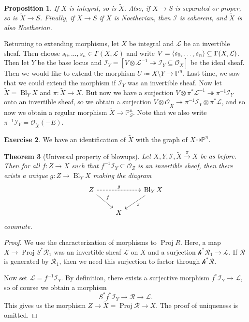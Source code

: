 \documentclass[leqno, openany]{memoir}
\newtheorem{thm}{Theorem}[section]
\newtheorem{prop}[thm]{Proposition}
\theoremstyle{definition}
\newtheorem{exer}[thm]{Exercise}
\theoremstyle{remark}
\theoremstyle{plain}
\theoremstyle{definition}
\theoremstyle{remark}
\renewcommand{\P}{\mathbb{P}}
\newcommand{\mc}[1]{\mathcal{#1}}
\newcommand{\wt}[1]{\widetilde{#1}}
\DeclareMathOperator{\Proj}{Proj}
\DeclareMathOperator{\Bl}{Bl}
\begin{document}
\begin{prop} If $X$ is integral, so is $\wt{X}$. Also, if $X \to S$ is
separated or proper, so is $\wt{X} \to S$. Finally, if $X \to S$ if $X$ is
Noetherian, then $\mc{I}$ is coherent, and $\wt{X}$ is also Noetherian.
\end{prop}

Returning to extending morphisms, let $X$ be integral and $\mc{L}$ be an
invertible sheaf. Then choose $s_0, \ldots, s_n \in \Gamma(X, \mc{L})$ and
write $V = \ev{s_0, \ldots, s_n} \subseteq \Gamma(X, \mc{L})$. Then let $Y$ be
the base locus and $\mc{I}_Y = [V \otimes \mc{L}^{-1} \twoheadrightarrow
\mc{I}_Y \subseteq \mc{O}_X]$ be the ideal sheaf. Then we would like to extend
the morphism $U \coloneqq X \setminus Y \to \P^n$. Last time, we saw that we
could extend the morphism if $\mc{I}_Y$ was an invertible sheaf. Now let
$\wt{X} = \Bl_Y X$ and $\pi \colon \wt{X} \to X$. But now we have a surjection
$V \otimes \pi^* \mc{L}^{-1} \twoheadrightarrow \pi^{-1} \mc{I}_Y$ onto an
invertible sheaf, so we obtain a surjection $V \otimes \mc{O}_{\wt{X}}
\twoheadrightarrow \pi^{-1} \mc{I}_Y \otimes \pi^* \mc{L}$, and so now we
obtain a regular morphism $\wt{X} \to \P^n_S$. Note that we also write
$\pi^{-1} \mc{I}_Y = \mc{O}_{\wt{X}}(-E)$.

\begin{exer} We have an identification of $\wt{X}$ with the graph of $X
\dashrightarrow \P^n$.  \end{exer}

\begin{thm}[Universal property of blowups] Let $X, Y, \mc{I}, \wt{X}
    \xrightarrow{\pi} X$ be as before. Then for all $f \colon Z \to X$ such
    that $f^{-1} \mc{I}_Y \subseteq \mc{O}_Z$ is an invertible sheaf, then
    there exists a unique $g \colon Z \to \Bl_Y X$ making the diagram
    \begin{equation*} \begin{tikzcd} Z \ar[dashrightarrow]{rr}{g} \ar{dr}{f} &
    & \Bl_Y X \ar{dl}{\pi} \\ & X \end{tikzcd} \end{equation*} commute.
    \end{thm}

\begin{proof} We use the characterization of morphisms to $\Proj R$. Here, a
    map $X \to \Proj S^* \mc{R}_1$ was an invertible sheaf $\mc{L}$ on $X$ and
    a surjection $\mc{h}^* \mc{R}_1 \to \mc{L}$. If $\mc{R}$ is generated by
    $\mc{R}_1$, then we need this surjection to factor through $\mc{h}^*
    \mc{R}$. 

    Now set $\mc{L} = f^{-1} \mc{I}_Y$. By definition, there exists a
    surjective morphism $f^* \mc{I}_Y \to \mc{L}$, so of course we obtain a
    morphism \[ S^* f^* \mc{I}_Y \to \mc{R} \to \mc{L}. \] This gives us the
    morphism $Z \to \wt{X} = \Proj \mc{R} \to X$. The proof of uniqueness is
    omitted.  \end{proof}
\end{document}
